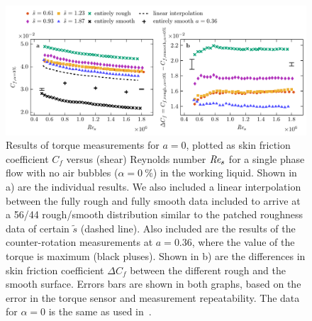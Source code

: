 \documentclass[aps,twocolumn,10pt,floatfix, superscriptaddress,longbibliography,pra]{revtex4-1}
\newcommand\Rey{\mbox{\textit{Re$_s$}}}  %
\newcommand{\perc}[1]{ \SI{#1}{\percent} }
\begin{document}
\begin{figure}
  \includegraphics[scale=1]{./figures/fig5_DR_rough_smooth_alpha=0}
  \caption{Results of torque measurements for $a=0$, plotted as skin friction coefficient $C_f$ versus (shear) Reynolds number $\Rey$ for a single phase flow with no air bubbles ($\alpha = \perc{0}$) in the working liquid. Shown in a) are the individual results. We also included a linear interpolation between the fully rough and fully smooth data included to arrive at a 56/44 rough/smooth distribution similar to the patched roughness data of certain $\tilde{s}$ (dashed line). Also included are the results of the counter-rotation measurements at $a = 0.36$, where the value of the torque is maximum (black pluses). Shown in b) are the differences in skin friction coefficient $\Delta C_f$ between the different rough and the smooth surface. Errors bars are shown in both graphs, based on the error in the torque sensor and measurement repeatability. The data for $\alpha = 0$ is the same as used in~\citep{Bakhuis2019}.}\label{fig:singlephase}
\end{figure}
\end{document}
